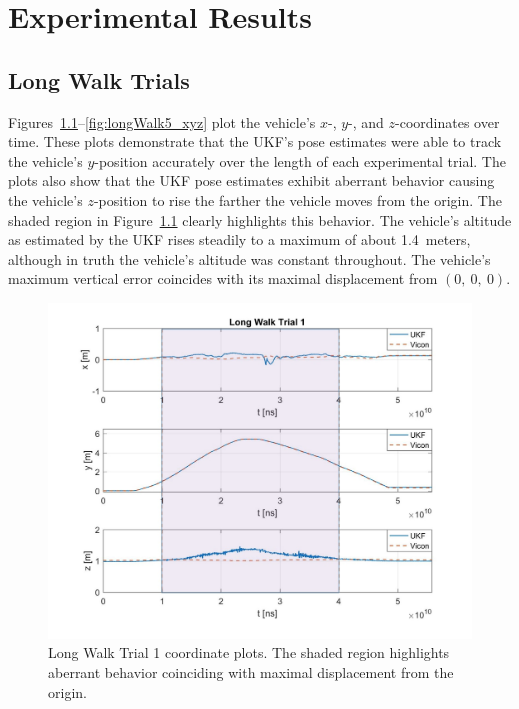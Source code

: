 \chapter{Experimental Results}

\section{Long Walk Trials}

Figures~\ref{fig:longWalk1_xyz}--\ref{fig:longWalk5_xyz} plot the vehicle's $x$-, $y$-, and $z$-coordinates over time. These plots demonstrate that the UKF's pose estimates were able to track the vehicle's $y$-position accurately over the length of each experimental trial. The plots also show that the UKF pose estimates exhibit aberrant behavior causing the vehicle's $z$-position to rise the farther the vehicle moves from the origin. The shaded region in Figure~\ref{fig:longWalk1_xyz} clearly highlights this behavior. The vehicle's altitude as estimated by the UKF rises steadily to a maximum of about 1.4~meters, although in truth the vehicle's altitude was constant throughout. The vehicle's maximum vertical error coincides with its maximal displacement from $\left( 0,\ 0,\ 0 \right)$. 

\begin{figure}
  \centering
    \includegraphics[width=\textwidth]{longWalk1_xyz}
  \caption[Long Walk Trial 1]{Long Walk Trial 1 coordinate plots. The shaded region highlights aberrant behavior coinciding with maximal displacement from the origin.}
  \label{fig:longWalk1_xyz}
\end{figure}

